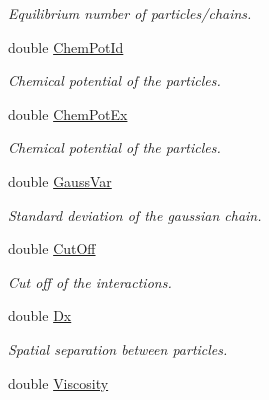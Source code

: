 \begin{DoxyCompactItemize}
\begin{DoxyCompactList}\small\item\em \-Equilibrium number of particles/chains. \end{DoxyCompactList}\item 
\hypertarget{classForces_a2e25f2942dd28ddaf03d12e8ece82c9a}{double \hyperlink{classForces_a2e25f2942dd28ddaf03d12e8ece82c9a}{\-Chem\-Pot\-Id}}\label{classForces_a2e25f2942dd28ddaf03d12e8ece82c9a}

\begin{DoxyCompactList}\small\item\em \-Chemical potential of the particles. \end{DoxyCompactList}\item 
\hypertarget{classForces_ab7f8fa6b5791ce382b080bb3cb2ff87a}{double \hyperlink{classForces_ab7f8fa6b5791ce382b080bb3cb2ff87a}{\-Chem\-Pot\-Ex}}\label{classForces_ab7f8fa6b5791ce382b080bb3cb2ff87a}

\begin{DoxyCompactList}\small\item\em \-Chemical potential of the particles. \end{DoxyCompactList}\item 
\hypertarget{classForces_a0b6541f9bb6a818203ef208f3f5ee9ea}{double \hyperlink{classForces_a0b6541f9bb6a818203ef208f3f5ee9ea}{\-Gauss\-Var}}\label{classForces_a0b6541f9bb6a818203ef208f3f5ee9ea}

\begin{DoxyCompactList}\small\item\em \-Standard deviation of the gaussian chain. \end{DoxyCompactList}\item 
\hypertarget{classForces_af2411aba2dd63fa22b1bc279653ff7a0}{double \hyperlink{classForces_af2411aba2dd63fa22b1bc279653ff7a0}{\-Cut\-Off}}\label{classForces_af2411aba2dd63fa22b1bc279653ff7a0}

\begin{DoxyCompactList}\small\item\em \-Cut off of the interactions. \end{DoxyCompactList}\item 
\hypertarget{classForces_aea50b2cb321ee5dfaa107a0726838e1a}{double \hyperlink{classForces_aea50b2cb321ee5dfaa107a0726838e1a}{\-Dx}}\label{classForces_aea50b2cb321ee5dfaa107a0726838e1a}

\begin{DoxyCompactList}\small\item\em \-Spatial separation between particles. \end{DoxyCompactList}\item 
\hypertarget{classForces_a0846f0b0f68bb4cbe7b44d53f6200139}{double \hyperlink{classForces_a0846f0b0f68bb4cbe7b44d53f6200139}{\-Viscosity}}\label{classForces_a0846f0b0f68bb4cbe7b44d53f6200139}


\end{DoxyCompactItemize}
